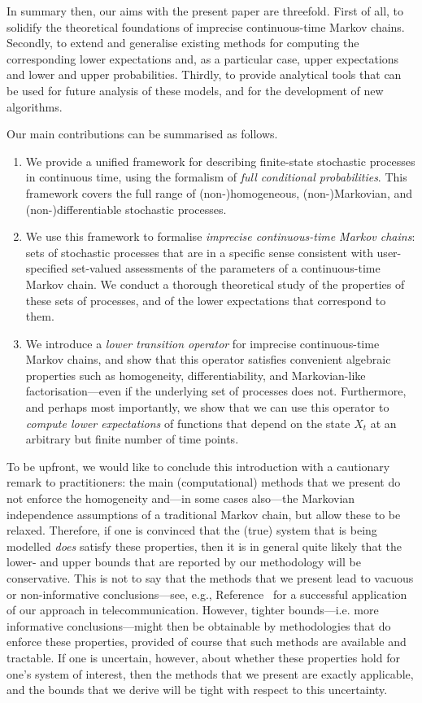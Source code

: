 \documentclass[10pt,a4paper]{paper}
\theoremstyle{definition}
\begin{document}
In summary then, our aims with the present paper are threefold. First of all, to solidify the theoretical foundations of imprecise continuous-time Markov chains. Secondly, to extend and generalise existing methods for computing the corresponding lower expectations and, as a particular case, upper expectations and lower and upper probabilities. Thirdly, to provide analytical tools that can be used for future analysis of these models, and for the development of new algorithms.

Our main contributions can be summarised as follows.
\begin{enumerate}
\item We provide a unified framework for describing finite-state stochastic processes in continuous time, using the formalism of \emph{full conditional probabilities}. This framework covers the full range of (non-)homogeneous, (non-)Markovian, and (non-)differentiable stochastic processes.
\item We use this framework to formalise \emph{imprecise continuous-time Markov chains}: sets of stochastic processes that are in a specific sense consistent with user-specified set-valued assessments of the parameters of a continuous-time Markov chain. We conduct a thorough theoretical study of the properties of these sets of processes, and of the lower expectations that correspond to them. 
\item We introduce a \emph{lower transition operator} for imprecise continuous-time Markov chains, and show that this operator satisfies convenient algebraic properties such as homogeneity, differentiability, and Markovian-like factorisation---even if the underlying set of processes does not. Furthermore, and perhaps most importantly, we show that we can use this operator to \emph{compute lower expectations} of functions that depend on the state $X_t$ at an arbitrary but finite number of time points.
\end{enumerate}

To be upfront, we would like to conclude this introduction with a cautionary remark to practitioners: the main (computational) methods that we present do not enforce the homogeneity and---in some cases also---the Markovian independence assumptions of a traditional Markov chain, but allow these to be relaxed. Therefore, if one is convinced that the (true) system that is being modelled \emph{does} satisfy these properties, then it is in general quite likely that the lower- and upper bounds that are reported by our methodology will be conservative. This is not to say that the methods that we present lead to vacuous or non-informative conclusions---see, e.g., Reference~\cite{Rottondi2017DRCN} for a successful application of our approach in telecommunication. However, tighter bounds---i.e. more informative conclusions---might then be obtainable by methodologies that do enforce these properties, provided of course that such methods are available and tractable. If one is uncertain, however, about whether these properties hold for one's system of interest, then the methods that we present are exactly applicable, and the bounds that we derive will be tight with respect to this uncertainty.
\end{document}
